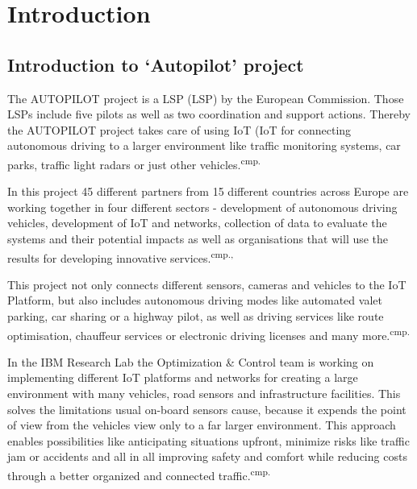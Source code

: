 
\chapter{Introduction}

\section{Introduction to `Autopilot' project}

The AUTOPILOT project is a \acs{LSP} (\acl{LSP}) by the European Commission. Those LSPs include five pilots as well as two coordination and support actions. Thereby the AUTOPILOT project takes care of using \acs{IoT} (\acl{IoT} for connecting autonomous driving to a larger environment like traffic monitoring systems, car parks, traffic light radars or just other vehicles.\textsuperscript{cmp.\cite{2}}


In this project 45 different partners from 15 different countries across Europe are working together in four different sectors - development of autonomous driving vehicles, development of IoT and networks, collection of data to evaluate the systems and their potential impacts as well as organisations that will use the results for developing innovative services.\textsuperscript{cmp.\cite{3},\cite{4}}


This project not only connects different sensors, cameras and vehicles to the IoT Platform, but also includes autonomous driving modes like automated valet parking, car sharing or a highway pilot, as well as driving services like route optimisation, chauffeur services or electronic driving licenses and many more.\textsuperscript{cmp.\cite{5}}


In the IBM Research Lab the Optimization \& Control team is working on implementing different IoT platforms and networks for creating a large environment with many vehicles, road sensors and infrastructure facilities. This solves the limitations usual on-board sensors cause, because it expends the point of view from the vehicles view only to a far larger environment. This approach enables possibilities like anticipating situations upfront, minimize risks like traffic jam or accidents and all in all improving safety and comfort while reducing costs through a better organized and connected traffic.\textsuperscript{cmp.\cite{6}}

